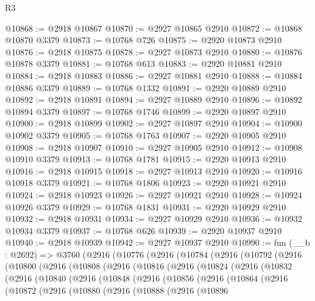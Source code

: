 \begin{lexlean}{R3}
\begin{coremodule}
@10868 := @2918 @10867
@10870 := @2927 @10865 @2910
@10872 := @10868 @10870 @3379
@10873 := @10768 @726
@10875 := @2920 @10873 @2910
@10876 := @2918 @10875
@10878 := @2927 @10873 @2910
@10880 := @10876 @10878 @3379
@10881 := @10768 @613
@10883 := @2920 @10881 @2910
@10884 := @2918 @10883
@10886 := @2927 @10881 @2910
@10888 := @10884 @10886 @3379
@10889 := @10768 @1332
@10891 := @2920 @10889 @2910
@10892 := @2918 @10891
@10894 := @2927 @10889 @2910
@10896 := @10892 @10894 @3379
@10897 := @10768 @1746
@10899 := @2920 @10897 @2910
@10900 := @2918 @10899
@10902 := @2927 @10897 @2910
@10904 := @10900 @10902 @3379
@10905 := @10768 @1763
@10907 := @2920 @10905 @2910
@10908 := @2918 @10907
@10910 := @2927 @10905 @2910
@10912 := @10908 @10910 @3379
@10913 := @10768 @1781
@10915 := @2920 @10913 @2910
@10916 := @2918 @10915
@10918 := @2927 @10913 @2910
@10920 := @10916 @10918 @3379
@10921 := @10768 @1806
@10923 := @2920 @10921 @2910
@10924 := @2918 @10923
@10926 := @2927 @10921 @2910
@10928 := @10924 @10926 @3379
@10929 := @10768 @1831
@10931 := @2920 @10929 @2910
@10932 := @2918 @10931
@10934 := @2927 @10929 @2910
@10936 := @10932 @10934 @3379
@10937 := @10768 @626
@10939 := @2920 @10937 @2910
@10940 := @2918 @10939
@10942 := @2927 @10937 @2910
@10990 := fun (__b : @2692) =>
  @3760
    (@2916
      (@10776
        (@2916
          (@10784
            (@2916
              (@10792
                (@2916
                  (@10800
                    (@2916
                      (@10808
                        (@2916
                          (@10816
                            (@2916
                              (@10824
                                (@2916
                                  (@10832
                                    (@2916
                                      (@10840
                                        (@2916
                                          (@10848
                                            (@2916
                                              (@10856
                                                (@2916
                                                  (@10864
                                                    (@2916
                                                      (@10872
                                                        (@2916
                                                          (@10880
                                                            (@2916
                                                              (@10888
                                                                (@2916
                                                                  (@10896

\end{coremodule}
\end{lexlean}
